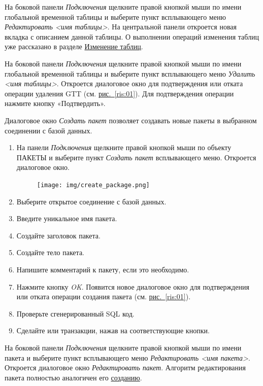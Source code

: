 На боковой панели \textit{Подключения} щелкните правой кнопкой мыши по имени глобальной временной таблицы и выберите пункт всплывающего меню \textit{Редактировать <имя таблицы>}. На центральной панели откроется новая вкладка с описанием данной таблицы. О выполнении операций изменения таблиц уже рассказано в разделе \hyperref[sec:alttable]{Изменение таблиц}.

На боковой панели \textit{Подключения} щелкните правой кнопкой мыши по имени глобальной временной таблицы и выберите пункт всплывающего меню \textit{Удалить <имя таблицы>}. Откроется  диалоговое окно для подтверждения или отката операции удаления GTT (см. \hyperref[ris:01]{рис.~\ref{ris:01}}). Для подтверждения операции нажмите кнопку «Подтвердить».


\label{sec:crpack}

Диалоговое окно \textit{Создать пакет} позволяет создавать новые пакеты в выбранном соединении с базой данных.

\begin{enumerate}[leftmargin=26pt]
	\item На панели \textit{Подключения} щелкните правой кнопкой мыши по объекту ПАКЕТЫ и выберите пункт \textit{Создать пакет} всплывающего меню. Откроется диалоговое окно.
	\begin{figure}[H]
		\centering
		\texttt{[image: img/create\_package.png]}
	\end{figure}
	\item Выберите открытое соединение с базой данных.
	\item Введите уникальное имя пакета.
	\item Создайте заголовок пакета.
	\item Создайте тело пакета.
	\item Напишите комментарий к пакету, если это необходимо.
	\item Нажмите кнопку \textit{OK}. Появится новое диалоговое окно для подтверждения или отката операции создания пакета (см. \hyperref[ris:01]{рис.~\ref{ris:01}}).
	\item Проверьте сгенерированный SQL код.
	\item Сделайте  или  транзакции, нажав на соответствующие кнопки.
\end{enumerate}

На боковой панели \textit{Подключения} щелкните правой кнопкой мыши по имени пакета и выберите пункт всплывающего меню \textit{Редактировать <имя пакета>}. Откроется диалоговое окно \textit{Редактировать пакет}. Алгоритм редактирования пакета полностью аналогичен его \hyperref[sec:crpack]{созданию}.

